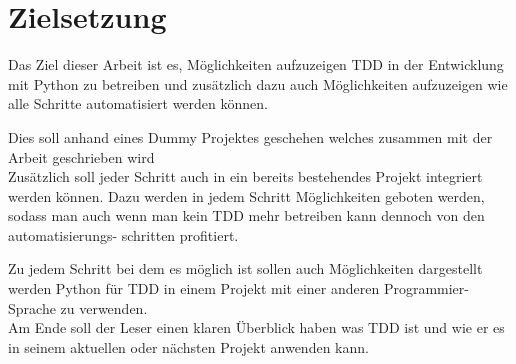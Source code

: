 \section{Zielsetzung}
Das Ziel dieser Arbeit ist es, Möglichkeiten aufzuzeigen TDD in der Entwicklung
mit Python zu betreiben und zusätzlich dazu auch Möglichkeiten aufzuzeigen wie
alle Schritte automatisiert werden können.

Dies soll anhand eines Dummy Projektes geschehen welches zusammen mit der Arbeit
geschrieben wird
\newline
\\
Zusätzlich soll jeder Schritt auch in ein bereits bestehendes Projekt integriert
werden können. Dazu werden in jedem Schritt Möglichkeiten geboten werden, sodass
man auch wenn man kein TDD mehr betreiben kann dennoch von den automatisierungs-
schritten profitiert.

Zu jedem Schritt bei dem es möglich ist sollen auch Möglichkeiten dargestellt werden
Python für TDD in einem Projekt mit einer anderen Programmier-Sprache zu verwenden.
\newline
\\
Am Ende soll der Leser einen klaren Überblick haben was TDD ist und wie er es in
seinem aktuellen oder nächsten Projekt anwenden kann.
